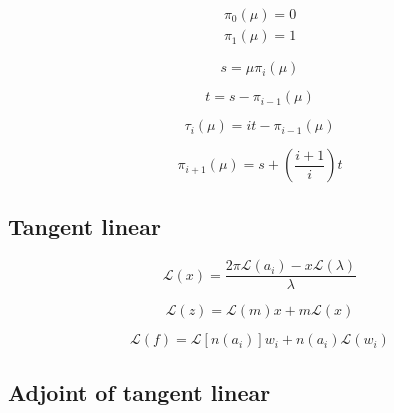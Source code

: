 \documentclass[letterpaper, 11pt]{article}
\begin{document}
\begin{gather}
\pi_{0}(\mu) = 0 \\
\pi_{1}(\mu) = 1
\label{eq:lmie_core_pi_0_and_pi_1}
\end{gather}

\begin{equation}
s = \mu \pi_{i}(\mu)
\label{eq:lmie_core_s}
\end{equation}

\begin{equation}
t = s - \pi_{i-1}(\mu)
\label{eq:lmie_core_t}
\end{equation}

\begin{equation}
\tau_{i}(\mu) = it - \pi_{i-1}(\mu)
\label{eq:lmie_core_tau_i}
\end{equation}

\begin{equation}
\pi_{i+1}(\mu) = s + \left(\frac{i + 1}{i}\right)t
\label{eq:lmie_core_pi_i_p_1}
\end{equation}


\subsection{Tangent linear}
\label{sec:lmie_core_tangent_linear}

\begin{equation}
\mathcal{L}(x) = \frac{2 \pi \mathcal{L}(a_{i}) - x \mathcal{L}(\lambda)}{\lambda}
\label{eq:lmie_core_x_l}
\end{equation}

\begin{equation}
\mathcal{L}(z) = \mathcal{L}(m) x + m \mathcal{L}(x)
\label{eq:lmie_core_z_l}
\end{equation}

\begin{equation}
\mathcal{L}(f) = \mathcal{L}\left[n(a_{i})\right] w_{i} + n(a_{i}) \mathcal{L}(w_{i})
\label{eq:lmie_core_f_l}
\end{equation}


\subsection{Adjoint of tangent linear}
\label{sec:lmie_core_adjoint_of_tangent_linear}
\end{document}
